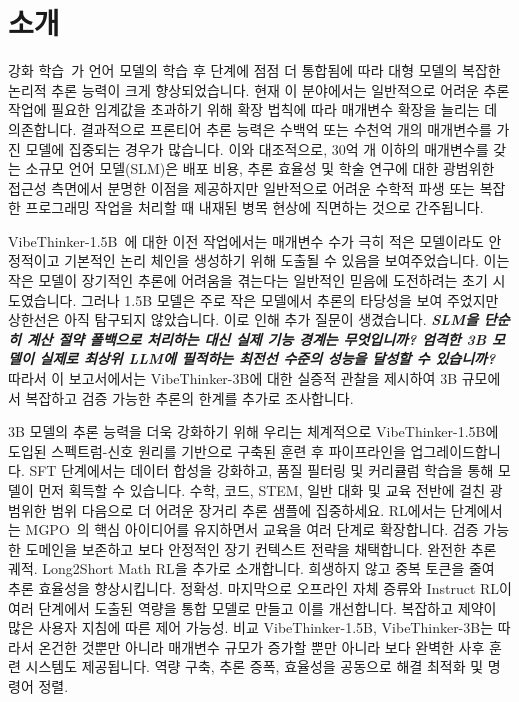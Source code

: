 \documentclass{article}
\begin{document}
\section{소개}


강화 학습~\cite{shao2024GRPO,yu2025dapo,zheng2025gspo,hu2025reinforce++}가 언어 모델의 학습 후 단계에 점점 더 통합됨에 따라 대형 모델의 복잡한 논리적 추론 능력이 크게 향상되었습니다. 현재 이 분야에서는 일반적으로 어려운 추론 작업에 필요한 임계값을 초과하기 위해 확장 법칙에 따라 매개변수 확장을 늘리는 데 의존합니다. 결과적으로 프론티어 추론 능력은 수백억 또는 수천억 개의 매개변수를 가진 모델에 집중되는 경우가 많습니다. 이와 대조적으로, 30억 개 이하의 매개변수를 갖는 소규모 언어 모델(SLM)은 배포 비용, 추론 효율성 및 학술 연구에 대한 광범위한 접근성 측면에서 분명한 이점을 제공하지만 일반적으로 어려운 수학적 파생 또는 복잡한 프로그래밍 작업을 처리할 때 내재된 병목 현상에 직면하는 것으로 간주됩니다.

VibeThinker-1.5B~\cite{xu2025vibethinker}에 대한 이전 작업에서는 매개변수 수가 극히 적은 모델이라도 안정적이고 기본적인 논리 체인을 생성하기 위해 도출될 수 있음을 보여주었습니다. 이는 작은 모델이 장기적인 추론에 어려움을 겪는다는 일반적인 믿음에 도전하려는 초기 시도였습니다. 그러나 1.5B 모델은 주로 작은 모델에서 추론의 타당성을 보여 주었지만 상한선은 아직 탐구되지 않았습니다. 이로 인해 추가 질문이 생겼습니다. \textbf{\textit{SLM을 단순히 계산 절약 폴백으로 처리하는 대신 실제 기능 경계는 무엇입니까? 엄격한 3B 모델이 실제로 최상위 LLM에 필적하는 최전선 수준의 성능을 달성할 수 있습니까?}} 따라서 이 보고서에서는 VibeThinker-3B에 대한 실증적 관찰을 제시하여 3B 규모에서 복잡하고 검증 가능한 추론의 한계를 추가로 조사합니다.

3B 모델의 추론 능력을 더욱 강화하기 위해 우리는 체계적으로
VibeThinker-1.5B에 도입된 스펙트럼-신호 원리를 기반으로 구축된 훈련 후 파이프라인을 업그레이드합니다. SFT 단계에서는 데이터 합성을 강화하고,
품질 필터링 및 커리큘럼 학습을 통해 모델이 먼저 획득할 수 있습니다.
수학, 코드, STEM, 일반 대화 및 교육 전반에 걸친 광범위한 범위
다음으로 더 어려운 장거리 추론 샘플에 집중하세요. RL에서는
단계에서는 MGPO~\cite{xu2025vibethinker}의 핵심 아이디어를 유지하면서 교육을 여러 단계로 확장합니다.
검증 가능한 도메인을 보존하고 보다 안정적인 장기 컨텍스트 전략을 채택합니다.
완전한 추론 궤적. Long2Short Math RL을 추가로 소개합니다.
희생하지 않고 중복 토큰을 줄여 추론 효율성을 향상시킵니다.
정확성. 마지막으로 오프라인 자체 증류와 Instruct RL이
여러 단계에서 도출된 역량을 통합 모델로 만들고 이를 개선합니다.
복잡하고 제약이 많은 사용자 지침에 따른 제어 가능성. 비교
VibeThinker-1.5B, VibeThinker-3B는 따라서 온건한 것뿐만 아니라
매개변수 규모가 증가할 뿐만 아니라 보다 완벽한 사후 훈련 시스템도 제공됩니다.
역량 구축, 추론 증폭, 효율성을 공동으로 해결
최적화 및 명령어 정렬.
\end{document}
